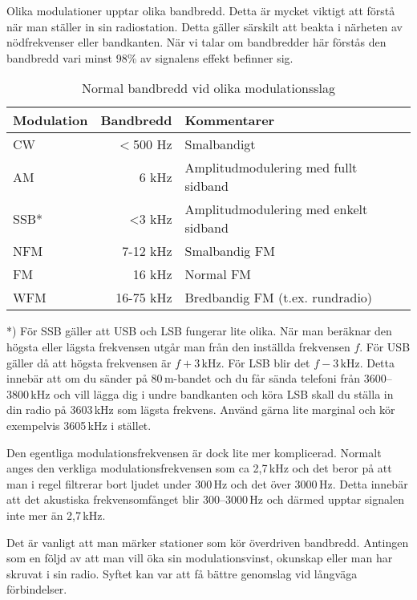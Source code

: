 Olika modulationer upptar olika bandbredd. Detta är mycket viktigt att förstå när man ställer in sin radiostation. Detta gäller särskilt att beakta i närheten av nödfrekvenser eller bandkanten. När vi talar om bandbredder här förstås den bandbredd vari minst 98\% av signalens effekt befinner sig.

\begin{table}[H]
\centering
\begin{tabular}{lrl}
	\textbf{Modulation} & \textbf{Bandbredd} & \textbf{Kommentarer}                  \\ \hline
	CW                  &          $<$500 Hz & Smalbandigt                           \\
	AM                  &              6 kHz & Amplitudmodulering med fullt sidband  \\
	SSB*                &              <3 kHz & Amplitudmodulering med enkelt sidband \\
	NFM                 &           7-12 kHz & Smalbandig FM                         \\
	FM                  &             16 kHz & Normal FM                             \\
	WFM                 &          16-75 kHz & Bredbandig FM (t.ex. rundradio)
\end{tabular}
\caption{Normal bandbredd vid olika modulationsslag}
\end{table}

*) För SSB gäller att USB och LSB fungerar lite olika. När man beräknar den högsta eller lägsta frekvensen utgår man från den inställda frekvensen $f$. För USB gäller då att högsta frekvensen är $f+3$\,kHz. För LSB blir det $f-3$\,kHz. Detta innebär att om du sänder på 80\,m-bandet och du får sända telefoni från 3600--3800\,kHz och vill lägga dig i undre bandkanten och köra LSB skall du ställa in din radio på 3603\,kHz som lägsta frekvens. Använd gärna lite marginal och kör exempelvis 3605\,kHz i stället.

Den egentliga modulationsfrekvensen är dock lite mer komplicerad. Normalt anges den verkliga modulationsfrekvensen som ca 2,7\,kHz och det beror på att man i regel filtrerar bort ljudet under 300\,Hz och det över 3000\,Hz. Detta innebär att det akustiska frekvensomfånget blir 300--3000\,Hz och därmed upptar signalen inte mer än 2,7\,kHz.

Det är vanligt att man märker stationer som kör överdriven bandbredd. Antingen som en följd av att man vill öka sin modulationsvinst, okunskap eller man har skruvat i sin radio. Syftet kan var att få bättre genomslag vid långväga förbindelser.

